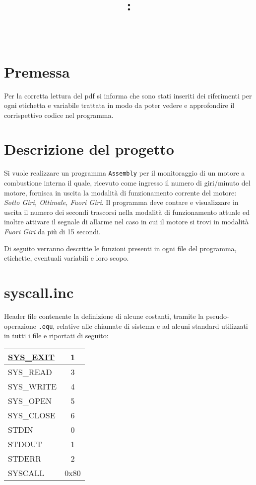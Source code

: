 \documentclass[a4paper,11pt]{article}
\title{
\vspace{2in}
\textmd{\textbf{\hmwkClass:\\ \hmwkTitle}}\\
\vspace{0.1in}\large{\textit{\hmwkAuthorName}}
\vspace{3in}
}
\newcommand{\Assembly}{\texttt{Assembly} }
\begin{document}
	\clearpage
	\maketitle
	\thispagestyle{empty}
	\newpage
	\tableofcontents
	\newpage
	
	\section{Premessa}
	Per la corretta lettura del pdf si informa che sono stati inseriti dei riferimenti per ogni etichetta e variabile trattata in modo da poter vedere e approfondire il corrispettivo codice nel programma. 
	
	\section{Descrizione del progetto}
	Si vuole realizzare un programma \Assembly per il monitoraggio di un motore a combustione interna il quale, ricevuto come ingresso il numero di giri/minuto del motore, fornisca in uscita la modalità di funzionamento corrente del motore: \textit{Sotto Giri, Ottimale, Fuori Giri}. Il programma deve contare e visualizzare in uscita il numero dei secondi trascorsi nella modalità di funzionamento attuale ed inoltre attivare il segnale di allarme nel caso in cui il motore si trovi in modalità \textit{Fuori Giri} da più di 15 secondi.
	
	\vspace {5mm}
	Di seguito verranno descritte le funzioni presenti in ogni file del programma, etichette, eventuali variabili e loro scopo. 
	
	\section{syscall.inc}
	Header file contenente la definizione di alcune costanti, tramite la pseudo-operazione \texttt{.equ}, relative alle chiamate di sistema e ad alcuni standard utilizzati in tutti i file e riportati di seguito:
	\begin{table}[!h]
		\begin{tabular}{| >{\ttfamily}l | c |}
			\hline
			\hyperref[s:1]{SYS\_EXIT} & 1 \\ \hline
			SYS\_READ & 3 \\ \hline
			SYS\_WRITE & 4 \\ \hline
			SYS\_OPEN & 5 \\ \hline
			SYS\_CLOSE & 6 \\ \hline
			STDIN & 0 \\ \hline
			STDOUT & 1 \\ \hline
			STDERR & 2			 \\ \hline
			SYSCALL & 0x80 \\ \hline
		\end{tabular}
	\end{table}
	
\end{document}
